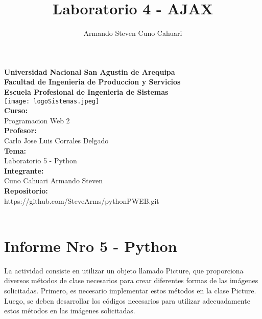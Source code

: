 \documentclass[10pt, a4paper]{article}
\title{Laboratorio 4 - AJAX}
\author{Armando Steven Cuno Cahuari}
\newcommand{\integrante}{\fontsize{13}{14}\selectfont Cuno Cahuari Armando Steven}
\newcommand{\curso}{ \fontsize{13}{14}\selectfont Programacion Web 2}
\newcommand{\tema}{\fontsize{13}{14}\selectfont Laboratorio 5 - Python}
\newcommand{\repositorio}{\fontsize{13}{14}\selectfont https://github.com/SteveArms/pythonPWEB.git}
\newcommand{\profesor}{Carlo Jose Luis Corrales Delgado}
\begin{document}
\begin{titlepage}
	\centering
	\textbf{\fontsize{20}{19}\selectfont Universidad Nacional San Agustin de Arequipa} \\
	\vspace{1em}
	\textbf{\fontsize{15}{16}\selectfont Facultad de Ingenieria de Produccion y Servicios} \\ 
	\vspace{1em}
	\textbf{\fontsize{15}{16}\selectfont Escuela Profesional de Ingenieria de Sistemas} \\
	\vspace{1cm}
	\texttt{[image: logoSistemas.jpeg]} \\
	\vspace{1cm}
	\textbf{\fontsize{13}{14}\selectfont Curso: } \\ \vspace{1em}
	\curso \\ \vspace{1em}
	\textbf{\fontsize{13}{14}\selectfont Profesor:} \\ \vspace{1em}
	\profesor \\ \vspace{1em}
	\textbf{\fontsize{13}{14}\selectfont Tema: } \\ \vspace{1em}
	\tema \\ \vspace{1em}
	\textbf{\fontsize{13}{14}\selectfont Integrante: } \\ \vspace{1em}
	\integrante \\ \vspace{1em}
	\textbf{\fontsize{13}{14}\selectfont Repositorio:} \\ \vspace{1em}
	\repositorio \\ \vspace{5em}
	\textbf{\fontsize{20}{14}} \\ \vspace{5em}
\end{titlepage}
\section*{\centering Informe Nro 5 - Python}
	\begin{flushleft}
		La actividad consiste en utilizar un objeto llamado Picture, que proporciona diversos métodos de clase necesarios para crear diferentes formas de las imágenes solicitadas. Primero, es necesario implementar estos métodos en la clase Picture. Luego, se deben desarrollar los códigos necesarios para utilizar adecuadamente estos métodos en las imágenes solicitadas.
	\end{flushleft}
\end{document}
